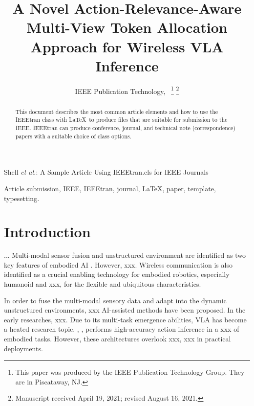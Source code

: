 \documentclass[lettersize,journal]{IEEEtran}
\theoremstyle{custom}
\begin{document}
\title{A Novel Action-Relevance-Aware Multi-View Token Allocation Approach for Wireless VLA Inference}

\author{IEEE Publication Technology,~
\thanks{This paper was produced by the IEEE Publication Technology Group. They are in Piscataway, NJ.}%
\thanks{Manuscript received April 19, 2021; revised August 16, 2021.}}

%
{Shell \MakeLowercase{\textit{et al.}}: A Sample Article Using IEEEtran.cls for IEEE Journals}


\maketitle

\begin{abstract}
This document describes the most common article elements and how to use the IEEEtran class with \LaTeX \ to produce files that are suitable for submission to the IEEE.  IEEEtran can produce conference, journal, and technical note (correspondence) papers with a suitable choice of class options. 
\end{abstract}

\begin{IEEEkeywords}
Article submission, IEEE, IEEEtran, journal, \LaTeX, paper, template, typesetting.
\end{IEEEkeywords}

\section{Introduction}
...  
Multi-modal sensor fusion and unstructured environment are identified as two key features of embodied AI \cite{li_developments_2025}. However, xxx. 
Wireless communication is also identified as a crucial enabling technology for embodied robotics, especially humanoid and xxx, for the flexible and ubiquitous characteristics. 

In order to fuse the multi-modal sensory data and adapt into the dynamic unstructured environments, xxx AI-assisted methods have been proposed. In the early researches, xxx. Due to its multi-task emergence abilities, VLA has become a heated research topic. \cite{}, \cite{}, \cite{} performs high-accuracy action inference in a xxx of embodied tasks. However, these architectures overlook xxx, xxx in practical deployments. 
\end{document}

